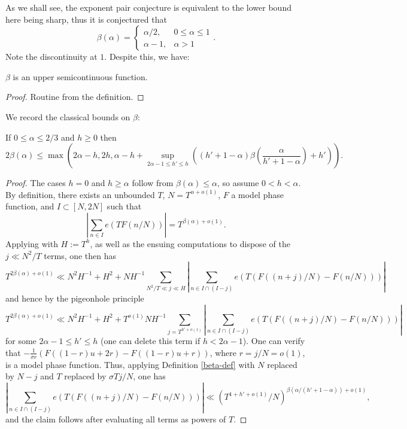 As we shall see, the exponent pair conjecture is equivalent to the lower bound here being sharp, thus it is conjectured that
\[
\beta(\alpha) = \begin{cases}
\alpha/2,& 0 \leq \alpha \leq 1\\
\alpha - 1,&\alpha > 1
\end{cases}.
\]
Note the discontinuity at $1$.  Despite this, we have:

\begin{lemma}\label{beta-semicts}
\leanok
$\beta$ is an upper semicontinuous function.
\end{lemma}

\begin{proof}\leanok
Routine from the definition.
\end{proof}

We record the classical bounds on $\beta$:

\begin{lemma}\label{vdca-beta}
\leanok
If $0 \leq \alpha \leq 2/3$ and $h \geq 0$ then
$$ 2\beta(\alpha) \leq \max\left( 2\alpha - h, 2h, \alpha - h + \sup_{2\alpha-1 \leq h' \leq h} \left((h'+1-\alpha)\beta\left(\frac{\alpha}{h'+1-\alpha}\right)+h'\right)\right).$$
\end{lemma}

\begin{proof}\leanok
The cases $h=0$ and $h\geq\alpha$ follow from $\beta(\alpha)\leq\alpha$, so assume $0<h<\alpha$. By definition, there exists an unbounded $T$, $N = T^{\alpha+o(1)}$, $F$ a model phase function, and $I \subset [N,2N]$ such that
    $$ \left|\sum_{n \in I} e(T F(n/N))\right| = T^{\beta(\alpha)+o(1)}.$$
Applying \cite[(2.54)]{ivic} with $H := T^h$, as well as the ensuing computations to dispose of the $j \ll N^2/T$ terms, one then has
$$ T^{2\beta(\alpha)+o(1)} \ll N^2 H^{-1} + H^2 + N H^{-1} \sum_{N^2/T \ll j \ll H} |\sum_{n \in I \cap (I-j)} e(T (F((n+j)/N) - F(n/N)))|$$
and hence by the pigeonhole principle
$$ T^{2\beta(\alpha)+o(1)} \ll N^2 H^{-1} + H^2 + T^{o(1)} N H^{-1} \sum_{j = T^{h'+o(1)}} |\sum_{n \in I \cap (I-j)} e(T (F((n+j)/N) - F(n/N)))|$$
for some $2\alpha-1 \leq h' \leq h$ (one can delete this term if $h < 2\alpha-1$).  One can verify that $-\frac{1}{\sigma r}(F((1-r)u+2r)-F((1-r)u+r))$, where $r=j/N=o(1)$, is a model phase function.  Thus, applying Definition \ref{beta-def} with $N$ replaced by $N-j$ and $T$ replaced by $\sigma Tj/N$, one has
$$ \left|\sum_{n \in I \cap (I-j)} e(T (F((n+j)/N) - F(n/N)))\right| \ll (T^{1+h'+o(1)}/N)^{\beta(\alpha/(h'+1-\alpha))+o(1)},$$
and the claim follows after evaluating all terms as powers of $T$.
\end{proof}


